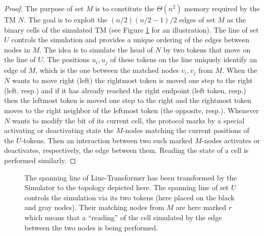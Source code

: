 \documentclass[preprint]{elsarticle}
\begin{document}
\begin{proof}
The purpose of set $M$ is to constitute the $\Theta(n^2)$ memory required by the TM $N$. The goal is to exploit the $(n/2)(n/2-1)/2$ edges of set $M$ as the binary cells of the simulated TM (see Figure \ref{fig:simulator} for an illustration). The line of set $U$ controls the simulation and provides a unique ordering of the edges between nodes in $M$. The idea is to simulate the head of $N$ by two tokens that move on the line of $U$. The positions $u_i,u_j$ of these tokens on the line uniquely identify an edge of $M$, which is the one between the matched nodes $v_i,v_j$ from $M$. When the $N$ wants to move right (left) the rightmost token is moved one step to the right (left, resp.) and if it has already reached the right endpoint (left token, resp.) then the leftmost token is moved one step to the right and the rightmost token moves to the right neighbor of the leftmost token (the opposite, resp.). Whenever $N$ wants to modify the bit of its current cell, the protocol marks by a special activating or deactivating state the $M$-nodes matching the current positions of the $U$-tokens. Then an interaction between two such marked $M$-nodes activates or deactivates, respectively, the edge between them. Reading the state of a cell is performed similarly.
\end{proof}

\begin{figure}[!hbtp]
\caption{The spanning line of Line-Transformer has been transformed by the Simulator to the topology depicted here. The spanning line of set $U$ controls the simulation via its two tokens (here placed on the black and gray nodes). Their matching nodes from $M$ are here marked $r$ which means that a ``reading'' of the cell simulated by the edge between the two nodes is being performed.} \label{fig:simulator}
\end{figure}
\end{document}
